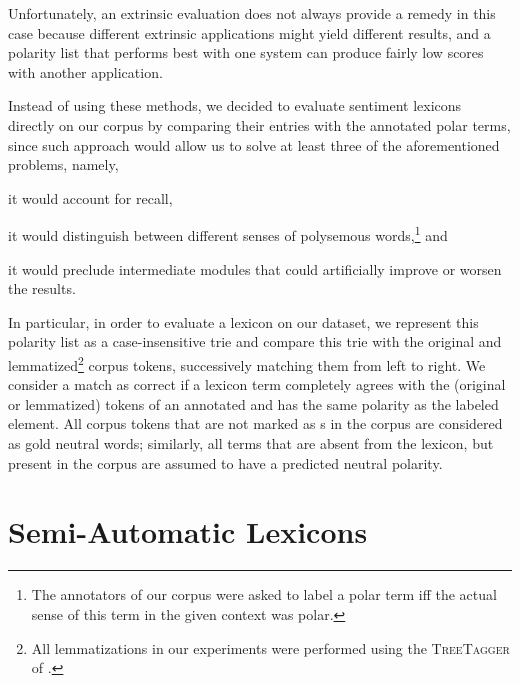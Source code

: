 Unfortunately, an extrinsic evaluation does not always provide a
remedy in this case because different extrinsic applications might
yield different results, and a polarity list that performs best with
one system can produce fairly low scores with another application.

Instead of using these methods, we decided to evaluate sentiment
lexicons directly on our corpus by comparing their entries with the
annotated polar terms, since such approach would allow us to solve at
least three of the aforementioned problems, namely,
\begin{inparaenum}[(i)]
  \item it would account for recall,
  \item it would distinguish between different senses of polysemous
    words,\footnote{The annotators of our corpus were asked to label a
      polar term iff the actual sense of this term in the given
      context was polar.} and
  \item it would preclude intermediate modules that could artificially
    improve or worsen the results.
\end{inparaenum}

In particular, in order to evaluate a lexicon on our dataset, we
represent this polarity list as a case-insensitive trie
\cite[pp. 492--512]{Knuth:98} and compare this trie with the original
and lemmatized\footnote{All lemmatizations in our experiments were
  performed using the \textsc{TreeTagger} of \citet{Schmid:95}.}
corpus tokens, successively matching them from left to right.  We
consider a match as correct if a lexicon term completely agrees with
the (original or lemmatized) tokens of an annotated  and has the same polarity as the labeled element.  All corpus
tokens that are not marked as s in the corpus are
considered as gold neutral words; similarly, all terms that are absent
from the lexicon, but present in the corpus are assumed to have a
predicted neutral polarity.

\section{Semi-Automatic Lexicons}

